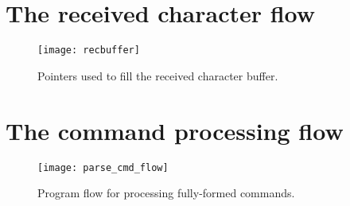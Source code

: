 \clearpage{}
\section{The received character flow}

\begin{figure}[ht]
    \begin{center}
        \texttt{[image: recbuffer]}
        \caption{Pointers used to fill the received character buffer.\label{fig:recbuffer}}
    \end{center}
\end{figure}






\clearpage{}
\section{The command processing flow}

\begin{figure}[ht]
    \begin{center}
        \texttt{[image: parse\_cmd\_flow]}
        \caption{Program flow for processing fully-formed commands.\label{fig:cmdflow}}
    \end{center}
\end{figure}






